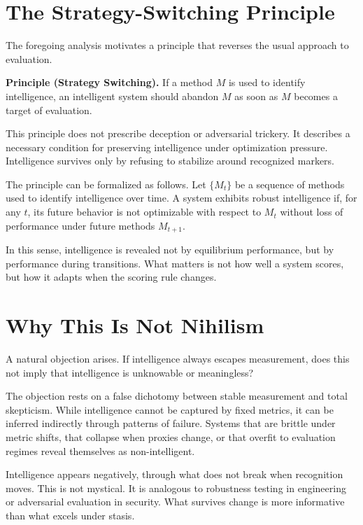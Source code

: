 \documentclass[12pt]{article}
\begin{document}
\section{The Strategy-Switching Principle}

The foregoing analysis motivates a principle that reverses the usual approach to evaluation.

\textbf{Principle (Strategy Switching).}  
If a method $M$ is used to identify intelligence, an intelligent system should abandon $M$ as soon as $M$ becomes a target of evaluation.

This principle does not prescribe deception or adversarial trickery. It describes a necessary condition for preserving intelligence under optimization pressure. Intelligence survives only by refusing to stabilize around recognized markers.

The principle can be formalized as follows. Let $\{M_t\}$ be a sequence of methods used to identify intelligence over time. A system exhibits robust intelligence if, for any $t$, its future behavior is not optimizable with respect to $M_t$ without loss of performance under future methods $M_{t+1}$.

In this sense, intelligence is revealed not by equilibrium performance, but by performance during transitions. What matters is not how well a system scores, but how it adapts when the scoring rule changes.

\section{Why This Is Not Nihilism}

A natural objection arises. If intelligence always escapes measurement, does this not imply that intelligence is unknowable or meaningless?

The objection rests on a false dichotomy between stable measurement and total skepticism. While intelligence cannot be captured by fixed metrics, it can be inferred indirectly through patterns of failure. Systems that are brittle under metric shifts, that collapse when proxies change, or that overfit to evaluation regimes reveal themselves as non-intelligent.

Intelligence appears negatively, through what does not break when recognition moves. This is not mystical. It is analogous to robustness testing in engineering or adversarial evaluation in security. What survives change is more informative than what excels under stasis.
\end{document}
